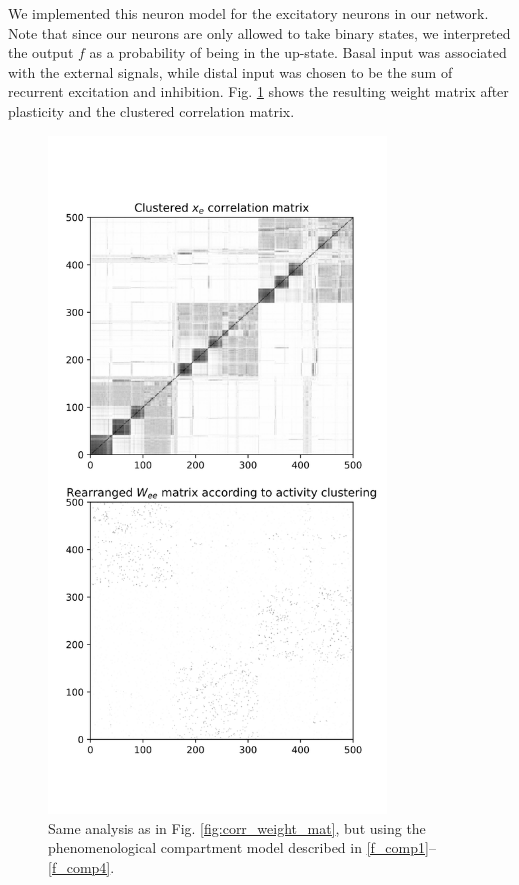 \documentclass[10pt,a4paper]{article}
\begin{document}
We implemented this neuron model for the excitatory neurons in our network. Note that since our neurons are only allowed to take binary states, we interpreted the output $f$ as a probability of being in the up-state. Basal input was associated with the external signals, while distal input was chosen to be the sum of recurrent excitation and inhibition. Fig. \ref{fig:corr_weight_mat_prox_dist} shows the resulting weight matrix after plasticity and the clustered correlation matrix.

\begin{figure}
\includegraphics[width=0.8\textwidth]{../../plots/corr_weight_mat_prox_dist.png}
\caption{\label{fig:corr_weight_mat_prox_dist} Same analysis as in Fig. \ref{fig:corr_weight_mat}, but using the phenomenological compartment model described in \eqref{f_comp1}--\eqref{f_comp4}.}
\end{figure}
\end{document}
